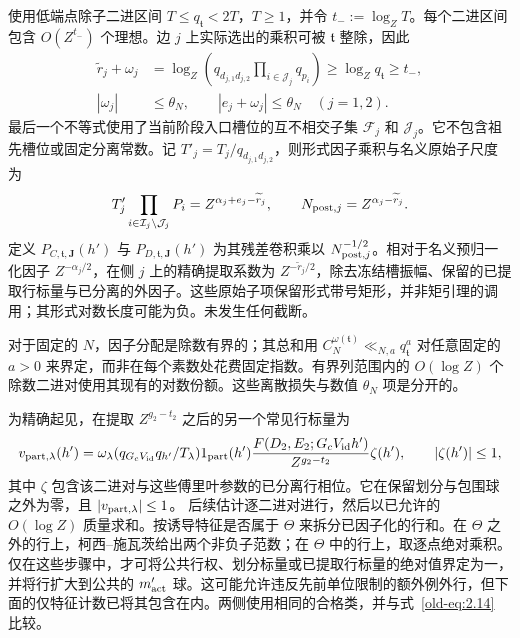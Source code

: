 \documentclass[11pt,a4paper]{article}
\numberwithin{equation}{section}
\numberwithin{figure}{section}
\theoremstyle{definition}
\theoremstyle{remark}
\begin{document}
使用低端点除子二进区间 \(T\le q_{\mathfrak t}<2T\)，\(T\ge1\)，并令 \(t_-:=\log_ZT\)。每个二进区间包含 \(O(Z^{t_-})\) 个理想。边 \(j\) 上实际选出的乘积可被 \(\mathfrak t\) 整除，因此
\begin{equation}
 \begin{aligned}
 \widetilde r_j+\omega_j
 &=\log_Z\left(q_{d_{j,1}d_{j,2}}
                  \prod_{i\in\mathcal J_j}q_{p_i}\right)
 \ge\log_Zq_{\mathfrak t}\ge t_-,\\
 |\omega_j|&\le\theta_N,\qquad |e_j+\omega_j|\le\theta_N
 \quad(j=1,2).
 \end{aligned}
 \label{eq:centered-divisor-boundary}
\end{equation}
最后一个不等式使用了当前阶段入口槽位的互不相交子集 \(\mathcal F_j\) 和 \(\mathcal J_j\)。它不包含祖先槽位或固定分离常数。记 \(T'_j=T_j/q_{d_{j,1}d_{j,2}}\)，则形式因子乘积与名义原始子尺度为
\begin{equation}
 T'_j\prod_{i\in\mathcal I_j\setminus\mathcal J_j}P_i
   =Z^{\alpha_j+e_j-\widetilde r_j},\qquad
 N_{{\rm post},j}=Z^{\alpha_j-\widetilde r_j}.
 \label{eq:centered-raw-normalization}
\end{equation}
定义 \(P_{C,\mathfrak t,\mathbf J}(h')\) 与
\(P_{D,\mathfrak t,\mathbf J}(h')\) 为其残差卷积乘以 \(N_{{\rm post},j}^{-1/2}\)。相对于名义预归一化因子 \(Z^{-\alpha_j/2}\)，在侧 \(j\) 上的精确提取系数为 \(Z^{-\widetilde r_j/2}\)，除去冻结槽振幅、保留的已提取行标量与已分离的外因子。这些原始子项保留形式带号矩形，并非矩引理的调用；其形式对数长度可能为负。未发生任何截断。

对于固定的 \(N\)，因子分配是除数有界的；其总和用 \(C_N^{\omega(\mathfrak t)}
\ll_{N,a}q_{\mathfrak t}^a\) 对任意固定的 \(a>0\) 来界定，而非在每个素数处花费固定指数。有界列范围内的 \(O(\log Z)\) 个除数二进对使用其现有的对数份额。这些离散损失与数值 \(\theta_N\) 项是分开的。

为精确起见，在提取 \(Z^{g_2-t_2}\) 之后的另一个常见行标量为
\[
 v_{{\rm part},\lambda}(h')=
 \omega_\lambda(q_{G_cV_{\rm id}}q_{h'}/T_\lambda)
 1_{\rm part}(h')
 \frac{F(D_2,E_2;G_cV_{\rm id}h')}{Z^{g_2-t_2}}\zeta(h'),
 \qquad |\zeta(h')|\le1,
\]
其中 \(\zeta\) 包含该二进对与这些傅里叶参数的已分离行相位。它在保留划分与包围球之外为零，且 \(|v_{{\rm part},\lambda}|\le1\)。
后续估计逐二进对进行，然后以已允许的 \(O(\log Z)\) 质量求和。按诱导特征是否属于 \(\Theta\) 来拆分已因子化的行和。在 \(\Theta\) 之外的行上，柯西--施瓦茨给出两个非负子范数；在 \(\Theta\) 中的行上，取逐点绝对乘积。仅在这些步骤中，才可将公共行权、划分标量或已提取行标量的绝对值界定为一，并将行扩大到公共的 \(m'_{\rm act}\) 球。这可能允许违反先前单位限制的额外例外行，但下面的仅特征计数已将其包含在内。两侧使用相同的合格类，并与式~\eqref{old-eq:2.14} 比较。
\end{document}
